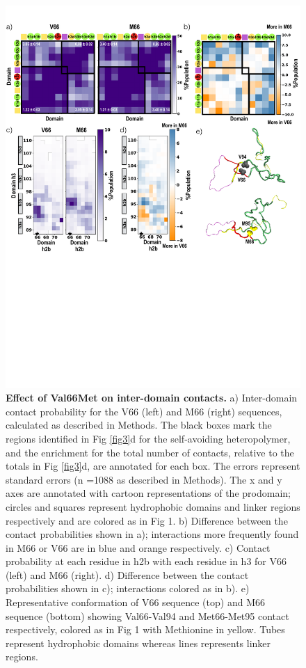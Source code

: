 \documentclass[10pt,letterpaper]{article}
\begin{document}
\begin{figure}[!ht]
\includegraphics[scale=0.3,width=\textwidth,trim={0 0cm 0 0cm},clip]{../figures/fig4.pdf}
\caption{{\bf Effect of Val66Met on inter-domain contacts.} a) Inter-domain contact probability for the V66 (left) and M66 (right) sequences, calculated as described in Methods. The black boxes mark the regions identified in Fig \ref{fig3}d for the self-avoiding heteropolymer, and the enrichment for the total number of contacts, relative to the totals in Fig \ref{fig3}d, are annotated for each box. The errors represent standard errors (n =1088 as described in Methods). The x and y axes are annotated with cartoon representations of the prodomain; circles and squares represent hydrophobic domains and linker regions respectively and are colored as in Fig 1. %
b) Difference between the contact probabilities shown in a); interactions more frequently found in M66 or V66 are in blue and orange respectively. c) Contact probability at each residue in h2b with each residue in h3 for V66 (left) and M66 (right). d) Difference between the contact probabilities shown in c); interactions colored as in b). e) Representative conformation of V66 sequence (top) and M66 sequence (bottom) showing Val66-Val94 and Met66-Met95 contact respectively, colored as in Fig 1 with Methionine in yellow. Tubes represent hydrophobic domains whereas lines represents linker regions.}
 
\label{fig4}
\end{figure}
\end{document}
